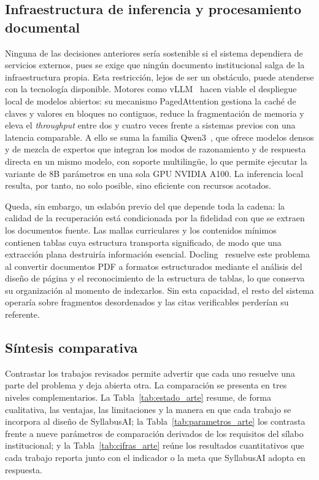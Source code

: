 \subsection{Infraestructura de inferencia y procesamiento documental}
Ninguna de las decisiones anteriores sería sostenible si el sistema dependiera de servicios externos, pues se exige que ningún documento institucional salga de la infraestructura propia. Esta restricción, lejos de ser un obstáculo, puede atenderse con la tecnología disponible. Motores como vLLM~\cite{kwon2023vllm} hacen viable el despliegue local de modelos abiertos: su mecanismo PagedAttention gestiona la caché de claves y valores en bloques no contiguos, reduce la fragmentación de memoria y eleva el \textit{throughput} entre dos y cuatro veces frente a sistemas previos con una latencia comparable. A ello se suma la familia Qwen3~\cite{yang2025qwen3}, que ofrece modelos densos y de mezcla de expertos que integran los modos de razonamiento y de respuesta directa en un mismo modelo, con soporte multilingüe, lo que permite ejecutar la variante de 8B parámetros en una sola GPU NVIDIA A100. La inferencia local resulta, por tanto, no solo posible, sino eficiente con recursos acotados.

Queda, sin embargo, un eslabón previo del que depende toda la cadena: la calidad de la recuperación está condicionada por la fidelidad con que se extraen los documentos fuente. Las mallas curriculares y los contenidos mínimos contienen tablas cuya estructura transporta significado, de modo que una extracción plana destruiría información esencial. Docling~\cite{auer2024docling} resuelve este problema al convertir documentos PDF a formatos estructurados mediante el análisis del diseño de página y el reconocimiento de la estructura de tablas, lo que conserva su organización al momento de indexarlos. Sin esta capacidad, el resto del sistema operaría sobre fragmentos desordenados y las citas verificables perderían su referente.

\subsection{Síntesis comparativa}
Contrastar los trabajos revisados permite advertir que cada uno resuelve una parte del problema y deja abierta otra. La comparación se presenta en tres niveles complementarios. La Tabla~\ref{tab:estado_arte} resume, de forma cualitativa, las ventajas, las limitaciones y la manera en que cada trabajo se incorpora al diseño de SyllabusAI; la Tabla~\ref{tab:parametros_arte} los contrasta frente a nueve parámetros de comparación derivados de los requisitos del sílabo institucional; y la Tabla~\ref{tab:cifras_arte} reúne los resultados cuantitativos que cada trabajo reporta junto con el indicador o la meta que SyllabusAI adopta en respuesta.

